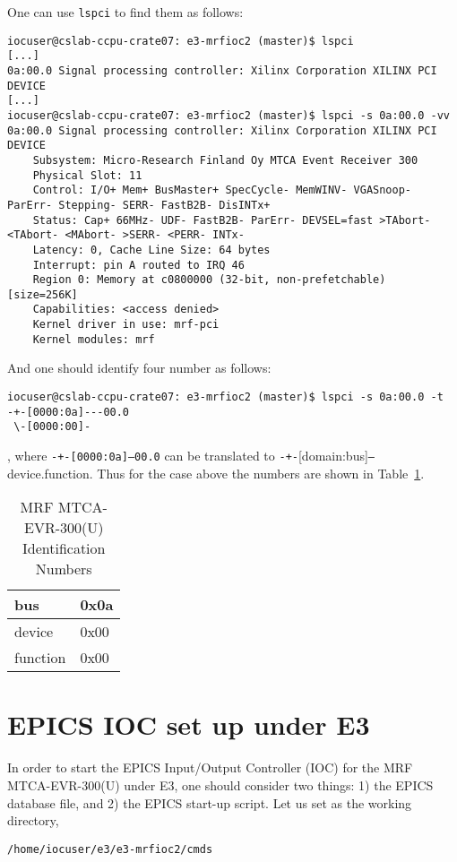 \documentclass[11pt
  , a4paper
  , article
  , oneside
  , showtrims
]{memoir}
\begin{document}
{One can use \texttt{lspci} to find them as follows:
\begin{lstlisting}[style=termstyle]
iocuser@cslab-ccpu-crate07: e3-mrfioc2 (master)$ lspci
[...]
0a:00.0 Signal processing controller: Xilinx Corporation XILINX PCI DEVICE
[...]
iocuser@cslab-ccpu-crate07: e3-mrfioc2 (master)$ lspci -s 0a:00.0 -vv
0a:00.0 Signal processing controller: Xilinx Corporation XILINX PCI DEVICE
	Subsystem: Micro-Research Finland Oy MTCA Event Receiver 300
	Physical Slot: 11
	Control: I/O+ Mem+ BusMaster+ SpecCycle- MemWINV- VGASnoop- ParErr- Stepping- SERR- FastB2B- DisINTx+
	Status: Cap+ 66MHz- UDF- FastB2B- ParErr- DEVSEL=fast >TAbort- <TAbort- <MAbort- >SERR- <PERR- INTx-
	Latency: 0, Cache Line Size: 64 bytes
	Interrupt: pin A routed to IRQ 46
	Region 0: Memory at c0800000 (32-bit, non-prefetchable) [size=256K]
	Capabilities: <access denied>
	Kernel driver in use: mrf-pci
	Kernel modules: mrf

\end{lstlisting}

And one should identify four number as follows:
\begin{lstlisting}[style=termstyle]
iocuser@cslab-ccpu-crate07: e3-mrfioc2 (master)$ lspci -s 0a:00.0 -t
-+-[0000:0a]---00.0
 \-[0000:00]-
\end{lstlisting}
, where \texttt{-+-[0000:0a]---00.0} can be translated to \texttt{-+-}[domain:bus]\texttt{---}device.function. Thus for the case above the numbers are shown in Table~\ref{table:pciidnumber}.\begin{table}[!htb]
  \centering
  \begin{tabular}{l|l}
    \toprule
    bus      & 0x0a \\\midrule
    device   & 0x00 \\\midrule
    function & 0x00 \\\bottomrule
  \end{tabular}
  \caption[]{MRF MTCA-EVR-300(U) Identification Numbers}
  \label{table:pciidnumber}
\end{table}


\section{EPICS IOC set up under E3}
In order to start the EPICS Input/Output Controller (IOC) for the MRF MTCA-EVR-300(U) under E3, one should consider two things: 1) the EPICS database file, and 2) the EPICS start-up script. Let us set as the working directory,
\begin{lstlisting}[style=termstyle, label={list:pwd}, caption={Working directory in the ICS lab.} ]
/home/iocuser/e3/e3-mrfioc2/cmds
\end{lstlisting}

}
\end{document}
